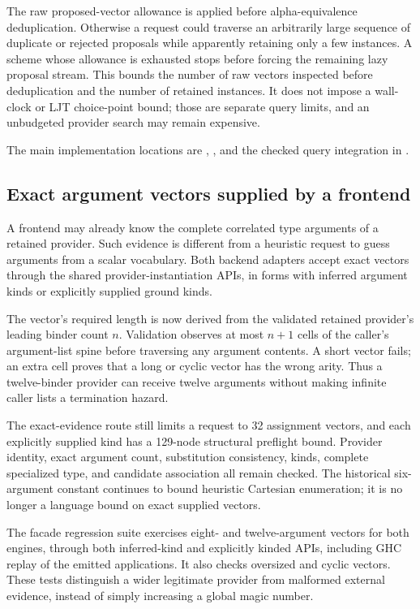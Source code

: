 \documentclass[11pt]{article}
\begin{document}
The raw proposed-vector allowance is applied before alpha-equivalence
deduplication. Otherwise a request could traverse an arbitrarily large sequence of
duplicate or rejected proposals while apparently retaining only a few
instances. A scheme whose allowance is exhausted stops before forcing the
remaining lazy proposal stream. This bounds the number of raw vectors inspected
before deduplication and the number of retained instances. It does not impose
a wall-clock or LJT choice-point bound; those are separate query limits, and
an unbudgeted provider search may remain expensive.

The main implementation locations are
,
, and the checked query
integration in .

\subsection{Exact argument vectors supplied by a frontend}

A frontend may already know the complete correlated type arguments of a
retained provider. Such evidence is different from a heuristic request to
guess arguments from a scalar vocabulary. Both backend adapters accept exact
vectors through the shared provider-instantiation APIs, in forms with inferred
argument kinds or explicitly supplied ground kinds.

The vector's required length is now derived from the validated retained
provider's leading binder count $n$. Validation observes at most $n+1$ cells
of the caller's argument-list spine before traversing any argument contents.
A short vector fails; an extra cell proves that a long or cyclic vector has
the wrong arity. Thus a twelve-binder provider can receive twelve arguments
without making infinite caller lists a termination hazard.

The exact-evidence route still limits a request to 32 assignment vectors, and
each explicitly supplied kind has a 129-node structural preflight bound.
Provider identity, exact argument count, substitution consistency, kinds,
complete specialized type, and candidate association all remain checked.
The historical six-argument constant continues to bound heuristic Cartesian
enumeration; it is no longer a language bound on exact supplied vectors.

The facade regression suite exercises eight- and twelve-argument vectors for
both engines, through both inferred-kind and explicitly kinded APIs, including
GHC replay of the emitted applications. It also checks oversized and cyclic
vectors. These tests distinguish a wider legitimate provider from malformed
external evidence, instead of simply increasing a global magic number.
\end{document}
